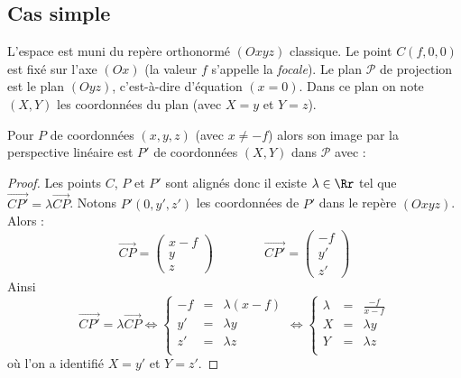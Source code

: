\documentclass[11pt,class=report,crop=false]{standalone}
\begin{document}
\subsection{Cas simple}

L'espace est muni du repère orthonormé $(Oxyz)$ classique.
Le point $C(f,0,0)$ est fixé sur l'axe $(Ox)$ (la valeur $f$ s'appelle la \emph{focale}).
Le plan $\mathcal{P}$ de projection est le plan $(Oyz)$, c'est-à-dire d'équation $(x=0)$. Dans ce plan on note $(X,Y)$ les coordonnées du plan (avec $X=y$ et $Y=z$).



\begin{proposition}
Pour $P$ de coordonnées $(x,y,z)$ (avec $x \neq -f$) alors son image par la perspective linéaire est $P'$ de coordonnées $(X,Y)$ dans $\mathcal{P}$ avec :
\end{proposition}


\begin{proof}
Les points $C$, $P$ et $P'$ sont alignés donc il existe $\lambda \in \Rr$ tel que $\overrightarrow{CP'} = \lambda \overrightarrow{CP}$.
Notons $P'(0,y',z')$ les coordonnées de $P'$ dans le repère $(Oxyz)$. Alors :
$$
\overrightarrow{CP} = \begin{pmatrix}x-f\\y\\z\end{pmatrix}
\qquad\qquad
\overrightarrow{CP'} = \begin{pmatrix}-f\\y'\\z'\end{pmatrix}$$
Ainsi
$$\overrightarrow{CP'} = \lambda \overrightarrow{CP}
\iff
\left\{\begin{array}{rcl}
-f &=& \lambda (x-f) \\
y'  &=& \lambda y \\
z' &=& \lambda z \\
\end{array}\right.
\iff
\left\{\begin{array}{rcl}
\lambda &=&  \frac{-f}{x-f} \\
X &=& \lambda y \\
Y &=& \lambda z \\
\end{array}\right.$$
où l'on a identifié $X=y'$ et $Y=z'$.
\end{proof}
\end{document}
